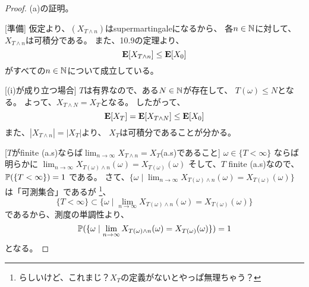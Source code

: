         \begin{proof}
        (a)の証明。

        [準備]
        仮定より、$(X_{T \wedge n})$はsupermartingaleになるから、
        各$n \in {\mathbb{N}}$に対して、$X_{T \wedge n}$は可積分である。
        また、10.9の定理より、
        \[
          {\mathbf{E}}[X_{T \wedge n}] \leq {\mathbf{E}}[X_0]
        \]
        がすべての$n \in {\mathbb{N}}$について成立している。

        [(i)が成り立つ場合]
        $T$は有界なので、ある$N \in {\mathbb{N}}$が存在して、
        $T(\omega) \leq N$となる。
        よって、$X_{T \wedge N} = X_T$となる。
        したがって、
        \[
          {\mathbf{E}}[X_T] = {\mathbf{E}}[X_{T \wedge N}] \leq {\mathbf{E}}[X_0]
        \]
        また、$|X_{T \wedge n}| = |X_T|$より、
        $X_T$は可積分であることが分かる。

        [$T$がfinite (a.s)ならば$\lim_{n \to \infty}X_{T \wedge n} = X_T $(a.s)であること]
        $\omega \in \{T < \infty\}$ ならば明らかに
        $\lim_{n \to \infty}X_{T(\omega) \wedge n}(\omega) = X_{T(\omega)}(\omega) $
        そして、$T$ finite (a.s)なので、${\mathbb{P}}(\{T < \infty\}) = 1$
        である。
        さて、$\{\omega \mid \lim_{n \to \infty}X_{T(\omega) \wedge n}(\omega) = X_{T(\omega)}(\omega)\}$
        は「可測集合」であるが
        \footnote{らしいけど、これまじ？$X_T$の定義がないとやっぱ無理ちゃう？}、
        \[
          \{T < \infty\} \subset \{\omega \mid \lim_{n \to \infty}X_{T(\omega) \wedge n}(\omega) = X_{T(\omega)}(\omega)\}
        \]
        であるから、測度の単調性より、
        \[
          {\mathbb{P}}(\{\omega \mid \lim_{n \to \infty}X_{T(\omega) \wedge n}(\omega) = X_{T(\omega)}(\omega)\}) = 1
        \]
        となる。


\end{proof}
